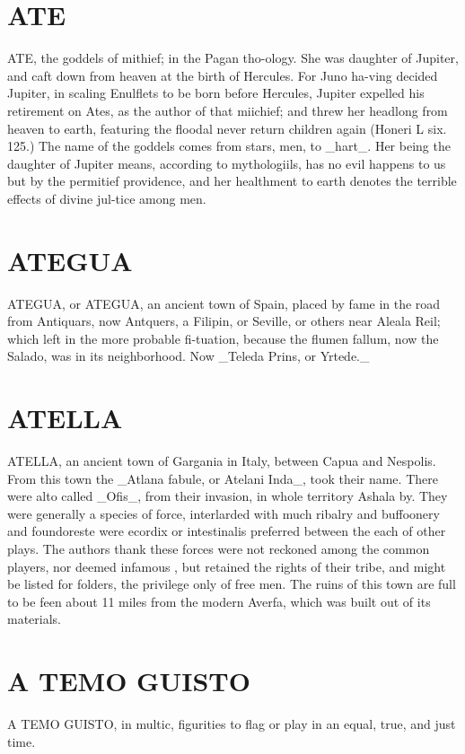 \documentclass{article}
\begin{document}
\section*{ATE}
ATE, the goddels of mithief; in the Pagan tho-ology. She was daughter of Jupiter, and caft down from heaven at the birth of Hercules. For Juno ha-ving decided Jupiter, in scaling Enulflets to be born before Hercules, Jupiter expelled his retirement on Ates, as the author of that miichief; and threw her headlong from heaven to earth, featuring the floodal never return children again (Honeri L six. 125.) The name of the goddels comes from stars, men, to \_hart\_. Her being the daughter of Jupiter means, according to mythologiils, has no evil happens to us but by the permitief providence, and her healthment to earth denotes the terrible effects of divine jul-tice among men.

\section*{ATEGUA}
ATEGUA, or ATEGUA, an ancient town of Spain, placed by fame in the road from Antiquars, now Antquers, a Filipin, or Seville, or others near Aleala Reil; which left in the more probable fi-tuation, because the flumen fallum, now the Salado, was in its neighborhood. Now \_Teleda Prins, or Yrtede.\_

\section*{ATELLA}
ATELLA, an ancient town of Gargania in Italy, between Capua and Nespolis. From this town the \_Atlana fabule, or Atelani Inda\_, took their name. There were alto called \_Ofis\_, from their invasion, in whole territory Ashala by. They were generally a species of force, interlarded with much ribalry and buffoonery and foundoreste were ecordix or intestinalis preferred between the each of other plays. The authors thank these forces were not reckoned among the common players, nor deemed infamous , but retained the rights of their tribe, and might be listed for folders, the privilege only of free men. The ruins of this town are full to be feen about 11 miles from the modern Averfa, which was built out of its materials.

\section*{A TEMO GUISTO}
A TEMO GUISTO, in multic, figurities to flag or play in an equal, true, and just time.
\end{document}
